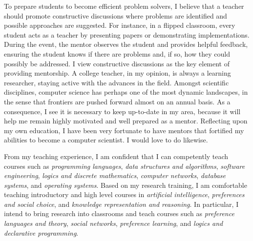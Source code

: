 \documentclass[12pt]{article}
\newcommand{\tit}[1]{\textit{#1}}
\begin{document}
To prepare students to become efficient problem solvers, 
I believe that a teacher should promote
constructive discussions where problems are identified and possible approaches are suggested.
For instance, in a flipped classroom, every student acts as a teacher by presenting papers
or demonstrating implementations.  During the event, the mentor observes the student and
provides helpful feedback, ensuring the student knows if there are problems and, if so,
how they could possibly be addressed.
I view constructive discussions as the key element of providing mentorship.
A college teacher, in my opinion, is always a learning researcher, staying
active with the advances in the field.
Amongst scientific disciplines,
computer science has perhaps one of the most dynamic landscapes, in the sense that
frontiers are pushed forward almost on an annual basis.
As a consequence, I see it is necessary to keep up-to-date in my area,
because it will help me remain highly motivated and well prepared as a mentor.
Reflecting upon my own education, I have been very fortunate to have mentors
that fortified my abilities to become a computer scientist.
I would love to do likewise.

From my teaching experience, I am confident that I can competently teach courses such as
\tit{programming languages}, \tit{data structures and algorithms}, \tit{software engineering},
\tit{logics and discrete mathematics},
\tit{computer networks}, \tit{database systems}, and \tit{operating systems}.
Based on my research training, I am comfortable teaching introductory and high 
level courses in \tit{artificial intelligence},
\tit{preferences and social choice}, and \tit{knowledge representation and reasoning}.
In particular, I intend to bring research into classrooms and teach courses such as
\tit{preference languages and theory}, \tit{social networks},
\tit{preference learning}, and \tit{logics and declarative programming}.
\end{document}
